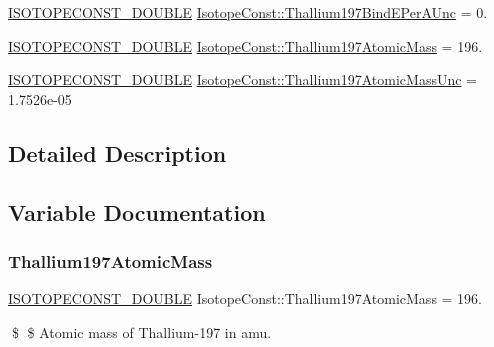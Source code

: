 \begin{DoxyCompactItemize}
\mbox{\hyperlink{group___isotope_const-_macros_ga8f45a7272ce02c0b4c65c44636ed719a}{I\+S\+O\+T\+O\+P\+E\+C\+O\+N\+S\+T\+\_\+\+D\+O\+U\+B\+LE}} \mbox{\hyperlink{group___isotope_const-_thallium-_tl197_ga4fd881fbd9429e893ba762da2b62c9d8}{Isotope\+Const\+::\+Thallium197\+Bind\+E\+Per\+A\+Unc}} = 0.
\item 
\mbox{\hyperlink{group___isotope_const-_macros_ga8f45a7272ce02c0b4c65c44636ed719a}{I\+S\+O\+T\+O\+P\+E\+C\+O\+N\+S\+T\+\_\+\+D\+O\+U\+B\+LE}} \mbox{\hyperlink{group___isotope_const-_thallium-_tl197_ga29600827fc00057aecd529c7da0f0fcb}{Isotope\+Const\+::\+Thallium197\+Atomic\+Mass}} = 196.
\item 
\mbox{\hyperlink{group___isotope_const-_macros_ga8f45a7272ce02c0b4c65c44636ed719a}{I\+S\+O\+T\+O\+P\+E\+C\+O\+N\+S\+T\+\_\+\+D\+O\+U\+B\+LE}} \mbox{\hyperlink{group___isotope_const-_thallium-_tl197_ga58653967e976d733947fbe66c00b9a3a}{Isotope\+Const\+::\+Thallium197\+Atomic\+Mass\+Unc}} = 1.\+7526e-\/05
\end{DoxyCompactItemize}


\subsection{Detailed Description}


\subsection{Variable Documentation}
\mbox{\label{group___isotope_const-_thallium-_tl197_ga29600827fc00057aecd529c7da0f0fcb}} 
\subsubsection{\texorpdfstring{Thallium197\+Atomic\+Mass}{Thallium197AtomicMass}}
{\footnotesize\ttfamily \mbox{\hyperlink{group___isotope_const-_macros_ga8f45a7272ce02c0b4c65c44636ed719a}{I\+S\+O\+T\+O\+P\+E\+C\+O\+N\+S\+T\+\_\+\+D\+O\+U\+B\+LE}} Isotope\+Const\+::\+Thallium197\+Atomic\+Mass = 196.}

\$ \$ Atomic mass of Thallium-\/197 in amu. \mbox{\label{group___isotope_const-_thallium-_tl197_ga58653967e976d733947fbe66c00b9a3a}} 
